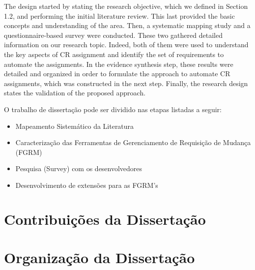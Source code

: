 The design started by stating the research objective, which we defined in Section 1.2, and
performing the initial literature review. This last provided the basic concepts and understanding of
the area. Then, a systematic mapping study and a questionnaire-based survey were conducted. These
two gathered detailed information on our research topic. Indeed, both of them were used to
understand the key aspects of CR assignment and identify the set of requirements to automate the
assignments. In the evidence synthesis step, these results were detailed and organized in order to
formulate the approach to automate CR assignments, which was constructed in the next step. Finally,
the research design states the validation of the proposed approach.

O trabalho de dissertação pode ser dividido nas etapas listadas a seguir:

\begin{itemize}[(i)]
	\item Mapeamento Sistemático da Literatura~\cite{keele2007guidelines}
	\item Caracterização das Ferramentas de Gerenciamento de Requisição de Mudança (FGRM)
	\item Pesquisa (Survey) com os desenvolvedores~\cite{wohlin2012experimentation}
	\item Desenvolvimento de extensões para as FGRM's
\end{itemize}

\section{Contribuições da Dissertação}
\label{sec:intro-contribuicao}

\section{Organização da Dissertação}
\label{sec:intro-organizacao-dissertacao}
